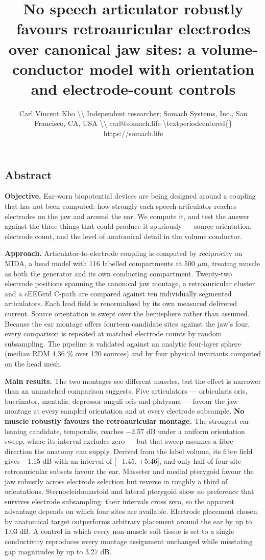 \documentclass[
  11pt,
]{article}
\title{No speech articulator robustly favours retroauricular electrodes over canonical jaw sites: a volume-conductor model with orientation and electrode-count controls}
\author{Carl Vincent Kho \textbackslash\textbackslash{} Independent researcher; Somach Systems, Inc., San Francisco, CA, USA \textbackslash\textbackslash{} carl@somach.life \textbackslash textperiodcentered\{\} https://somach.life}
\date{}
\begin{document}
\maketitle

\subsection{Abstract}\label{abstract}

\textbf{Objective.} Ear-worn biopotential devices are being designed around a
coupling that has not been computed: how strongly each speech articulator
reaches electrodes on the jaw and around the ear. We compute it, and test the
answer against the three things that could produce it spuriously --- source
orientation, electrode count, and the level of anatomical detail in the volume
conductor.

\textbf{Approach.} Articulator-to-electrode coupling is computed by reciprocity on
MIDA, a head model with 116 labelled compartments at 500 \(\mu\)m, treating muscle as
both the generator and its own conducting compartment. Twenty-two electrode
positions spanning the canonical jaw montage, a retroauricular cluster and a
cEEGrid C-path are compared against ten individually segmented articulators.
Each lead field is renormalised by its own measured delivered current. Source
orientation is swept over the hemisphere rather than assumed. Because the ear
montage offers fourteen candidate sites against the jaw's four, every comparison
is repeated at matched electrode counts by random subsampling. The pipeline is
validated against an analytic four-layer sphere (median RDM 4.36 \% over 120
sources) and by four physical invariants computed on the head mesh.

\textbf{Main results.} The two montages see different muscles, but the effect is
narrower than an unmatched comparison suggests. Five articulators ---
orbicularis oris, buccinator, mentalis, depressor anguli oris and platysma ---
favour the jaw montage at every sampled orientation and at every electrode
subsample. \textbf{No muscle robustly favours the retroauricular montage.} The
strongest ear-leaning candidate, temporalis, reaches −2.57 dB under a uniform
orientation sweep, where its interval excludes zero --- but that sweep assumes a
fibre direction the anatomy can supply. Derived from the label volume, its fibre
field gives −1.15 dB with an interval of {[}−1.45, +5.46{]}, and only half of
four-site retroauricular subsets favour the ear. Masseter and medial pterygoid
favour the jaw robustly across electrode selection but reverse in roughly a
third of orientations. Sternocleidomastoid and lateral pterygoid show no
preference that survives electrode subsampling: their intervals cross zero, so
the apparent advantage depends on which four sites are available. Electrode
placement chosen by anatomical target outperforms arbitrary placement around
the ear by up to 1.03 dB. A control in which every non-muscle soft tissue is
set to a single conductivity reproduces every montage assignment unchanged
while misstating gap magnitudes by up to 3.27 dB.
\end{document}
